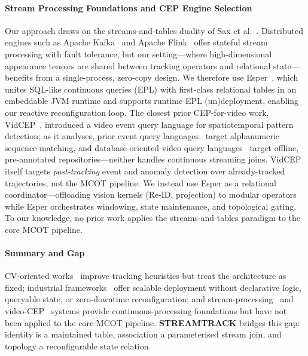 \documentclass[5p,times]{elsarticle}
\begin{document}
\paragraph{Stream Processing Foundations and CEP Engine Selection}
Our approach draws on the streams-and-tables duality of Sax et al.~\cite{sax2018streams}. Distributed engines such as Apache Kafka~\cite{kreps2011kafka} and Apache Flink~\cite{carbone2015flink} offer stateful stream processing with fault tolerance, but our setting---where high-dimensional appearance tensors are shared between tracking operators and relational state---benefits from a single-process, zero-copy design. We therefore use Esper~\cite{espertech2024}, which unites SQL-like continuous queries (EPL) with first-class relational tables in an embeddable JVM runtime and supports runtime EPL (un)deployment, enabling our reactive reconfiguration loop. The closest prior CEP-for-video work, VidCEP~\cite{yadav2019vidcep}, introduced a video event query language for spatiotemporal pattern detection; as it analyses, prior event query languages~\cite{chakravarthy1994snoop,wu2006sase,cugola2010tesla,demers2007cayuga} target alphanumeric sequence matching, and database-oriented video query languages~\cite{10.1145/951676.951682,li1997moql,donderler2005bilvideo,lu2015svql,le2008query} target offline, pre-annotated repositories---neither handles continuous streaming joins. VidCEP itself targets \emph{post-tracking} event and anomaly detection over already-tracked trajectories, not the MCOT pipeline. We instead use Esper as a relational coordinator---offloading vision kernels (Re-ID, projection) to modular operators while Esper orchestrates windowing, state maintenance, and topological gating. To our knowledge, no prior work applies the streams-and-tables paradigm to the core MCOT pipeline.

\paragraph{Summary and Gap}
CV-oriented works~\cite{yoshida2024overlap,kim2024cluster,xie2024robust,specker2024ocmctrack,yang2024online} improve tracking heuristics but treat the architecture as fixed; industrial frameworks~\cite{nvidia2024deepstream,nvidia2025metropolis} offer scalable deployment without declarative logic, queryable state, or zero-downtime reconfiguration; and stream-processing~\cite{sax2018streams,carbone2015flink,kreps2011kafka} and video-CEP~\cite{yadav2019vidcep} systems provide continuous-processing foundations but have not been applied to the core MCOT pipeline. \textbf{STREAMTRACK} bridges this gap: identity is a maintained table, association a parameterised stream join, and topology a reconfigurable state relation.
\end{document}
